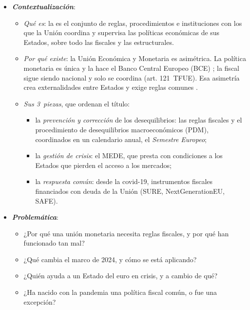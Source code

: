 \documentclass[11pt]{article}
\begin{document}
\begin{itemize}
\item \textbf{\emph{Contextualización}}:
  \begin{itemize}
  \item \emph{Qué es}: la  es el conjunto de reglas, procedimientos e instituciones con los que la Unión coordina y supervisa las políticas económicas de sus Estados, sobre todo las fiscales y las estructurales.
  \item \emph{Por qué existe}: la Unión Económica y Monetaria es asimétrica. La política monetaria es única y la hace el Banco Central Europeo (BCE) ; la fiscal sigue siendo nacional y solo se coordina (art. 121~TFUE). Esa asimetría crea externalidades entre Estados y exige reglas comunes .
  \item \emph{Sus 3~piezas}, que ordenan el título:
    \begin{itemize}
    \item la \emph{prevención y corrección} de los desequilibrios: las reglas fiscales y el procedimiento de desequilibrios macroeconómicos (PDM), coordinados en un calendario anual, el \emph{Semestre Europeo};
    \item la \emph{gestión de crisis}: el MEDE, que presta con condiciones a los Estados que pierden el acceso a los mercados;
    \item la \emph{respuesta común}: desde la covid-19, instrumentos fiscales financiados con deuda de la Unión (SURE, NextGenerationEU, SAFE).
    \end{itemize}
  \end{itemize}

\item \textbf{\emph{Problemática}}:
  \begin{itemize}
  \item ¿Por qué una unión monetaria necesita reglas fiscales, y por qué han funcionado tan mal?
  \item ¿Qué cambia el marco de 2024, y cómo se está aplicando?
  \item ¿Quién ayuda a un Estado del euro en crisis, y a cambio de qué?
  \item ¿Ha nacido con la pandemia una política fiscal común, o fue una excepción?
  \end{itemize}


\end{itemize}
\end{document}
